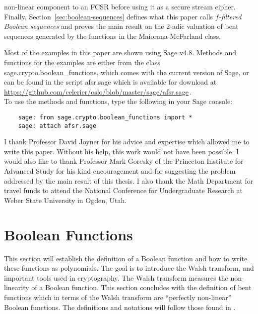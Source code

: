 \documentclass[english]{article}
\theoremstyle{plain}
\theoremstyle{definition}
\theoremstyle{remark}
\begin{document}
non-linear component to an FCSR before using it as a secure stream cipher. Finally,
Section~\ref{sec:boolean-sequences} defines what this paper calls {\it
$f$-filtered Boolean sequences} and proves the main result on the $2$-adic
valuation of bent sequences generated by the functions in the Maiorana-McFarland
class.
\par Most of the examples in this paper are shown using {\ttfamily Sage v4.8}.
Methods and functions for the examples are either from the class {\ttfamily
sage.\allowbreak crypto.\allowbreak boolean\_functions}, which comes with the current version of
{\ttfamily Sage}, or can be found in the script {\ttfamily afsr.sage} which
is available for download at\\
\vskip 0.1mm
\url{https://github.com/celerier/oslo/blob/master/sage/afsr.sage}\,.\\
\vskip 0.1mm
\noindent To use the methods and functions, type the following in your {\ttfamily Sage}
console:
  \begin{lstlisting}
    sage: from sage.crypto.boolean_functions import *
    sage: attach afsr.sage
  \end{lstlisting}

\vskip 0.2in
 I thank Professor David Joyner for his
advice and expertise which allowed me to write this paper. Without his help,
this work would not have been possible. I would also like to thank
Professor Mark Goresky of the Princeton Institute for Advanced Study for
his kind encouragement and for suggesting the problem addressed by the
main result of this thesis. I also thank the Math Department for travel
funds to attend the National Conference for Undergraduate Research at
Weber State University in Ogden, Utah.

\section{Boolean Functions}\label{sec:boolean-functions}
\par This section will establish the definition of a Boolean function
and how to write these functions as polynomials. The goal is to introduce the
Walsh transform, and important tools used in cryptography. The Walsh transform
measures the non-linearity of a Boolean function. This section concludes with
the definition of bent functions which in terms of the Walsh transform are
``perfectly non-linear'' Boolean functions. The definitions and
notations will follow those found in \cite{bk:cs09}.
\end{document}
